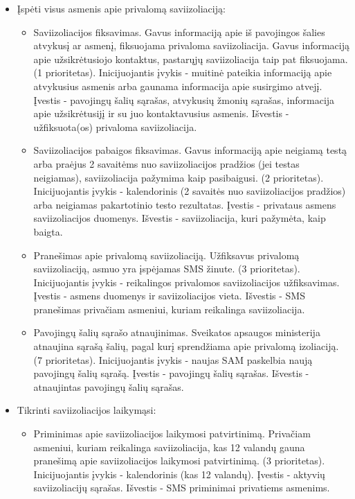 \documentclass{VUMIFPSkursinis}
\begin{document}
\begin{itemize}
	\item Įspėti visus asmenis apie privalomą saviizoliaciją:
	\begin{itemize}
		\item Saviizoliacijos fiksavimas. Gavus informaciją apie iš pavojingos šalies atvykusį ar asmenį, fiksuojama privaloma saviizoliacija. Gavus informaciją apie užsikrėtusiojo kontaktus, pastarųjų saviizoliacija taip pat fiksuojama. (1 prioritetas). Inicijuojantis įvykis - muitinė pateikia informaciją apie atvykusius asmenis arba gaunama informacija apie susirgimo atvejį. Įvestis - pavojingų šalių sąrašas, atvykusių žmonių sąrašas, informacija apie užsikrėtusijį ir su juo kontaktavusius asmenis. Išvestis - užfiksuota(os) privaloma saviizoliacija.
		\item Saviizoliacijos pabaigos fiksavimas. Gavus informaciją apie neigiamą testą arba praėjus 2 savaitėms nuo saviizoliacijos pradžios (jei testas neigiamas), saviizoliacija pažymima kaip pasibaigusi. (2 prioritetas). Inicijuojantis įvykis - kalendorinis (2 savaitės nuo saviizoliacijos pradžios) arba neigiamas pakartotinio testo rezultatas. Įvestis - privataus asmens saviizoliacijos duomenys. Išvestis - saviizoliacija, kuri pažymėta, kaip baigta.
		\item Pranešimas apie privalomą saviizoliaciją. Užfiksavus privalomą saviizoliaciją, asmuo yra įspėjamas SMS žinute. (3 prioritetas). Inicijuojantis įvykis - reikalingos privalomos saviizoliacijos užfiksavimas. Įvestis - asmens duomenys ir saviizoliacijos vieta. Išvestis - SMS pranešimas privačiam asmeniui, kuriam reikalinga saviizoliacija. 
		\item Pavojingų šalių sąrašo atnaujinimas. Sveikatos apsaugos ministerija atnaujina sąrašą šalių, pagal kurį sprendžiama apie privalomą izoliaciją. (7 prioritetas). Inicijuojantis įvykis - naujas SAM paskelbia naują pavojingų šalių sąrašą. Įvestis - pavojingų šalių sąrašas. Išvestis - atnaujintas pavojingų šalių sąrašas.
	\end{itemize}
	\item Tikrinti saviizoliacijos laikymąsi:
	\begin{itemize}
		\item Priminimas apie saviizoliacijos laikymosi patvirtinimą. Privačiam asmeniui, kuriam reikalinga saviizoliacija, kas 12 valandų gauna pranešimą apie saviizoliacijos laikymosi patvirtinimą. (3 prioritetas). Inicijuojantis įvykis - kalendorinis (kas 12 valandų). Įvestis - aktyvių saviizoliacijų sąrašas. Išvestis - SMS priminimai privatiems asmenims.

\end{itemize}
\end{itemize}
\end{document}
